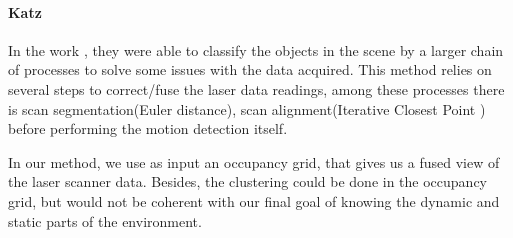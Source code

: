 \paragraph*{Katz}

In the work \cite{4650636}, they were able to classify the objects in the scene by a larger chain of processes to solve some issues with the data acquired. This method relies on several steps to correct/fuse the laser data readings, among these processes there is scan segmentation(Euler distance), scan alignment(Iterative Closest Point \cite{10.1109/34.121791}) before performing the motion detection itself. 

In our method, we use as input an occupancy grid, that gives us a fused view of the laser scanner data. Besides, the clustering could be done in the occupancy grid, but would not be coherent with our final goal of knowing the dynamic and static parts of the environment.


